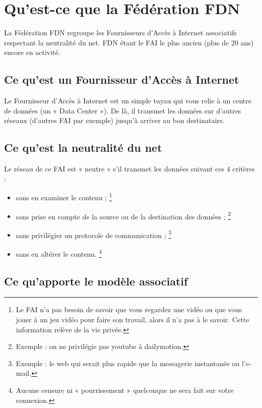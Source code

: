 \section{Qu'est-ce que la Fédération FDN}
La Fédération FDN regroupe les Fournisseurs d'Accès à Internet associatifs respectant la neutralité du net. 
FDN étant le FAI le plus ancien (plus de 20 ans) encore en activité.

\subsection{Ce qu'est un Fournisseur d'Accès à Internet}
Le Fournisseur d'Accès à Internet est un simple tuyau qui vous relie à un centre de données (un « Data Center »). 
De là, il transmet les données sur d'autres réseaux (d'autres FAI par exemple) jusqu'à arriver au bon destinataire.

\subsection{Ce qu'est la neutralité du net}
Le réseau de ce FAI est « neutre » s'il transmet les données suivant ces 4 critères :

\begin{itemize}
\item sans en examiner le contenu ;
\protect\footnote{
	Le FAI n'a pas besoin de savoir que vous regardez une vidéo ou que vous jouer à un jeu vidéo pour faire son travail, alors il n'a pas à le savoir.
	Cette information relève de la vie privée.
}
\item sans prise en compte de la source ou de la destination des données ;
\protect\footnote{
	Exemple : on ne privilégie pas youtube à dailymotion.
}
\item sans privilégier un protocole de communication ;
\protect\footnote{
	Exemple : le web qui serait plus rapide que la messagerie instantanée ou l'e-mail.
}
\item sans en altérer le contenu.
\protect\footnote{
	Aucune censure ni « pourrissement » quelconque ne sera fait sur votre connexion.
}
\end{itemize}

\subsection{Ce qu'apporte le modèle associatif}
